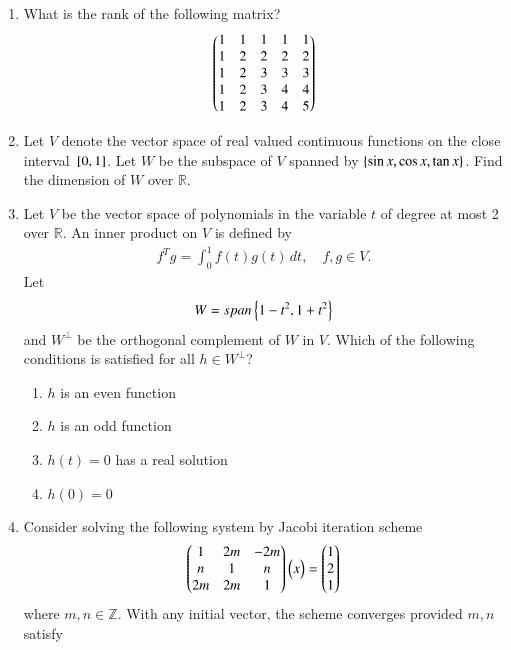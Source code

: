 \begin{enumerate}[label=\thesection.\arabic*.,ref=\thesection.\theenumi]
\begin{enumerate}
\end{enumerate}
\item What is the rank of the following matrix?
\begin{align}
\begin{pmatrix}
1 & 1 & 1 & 1 & 1 \\
1 & 2 & 2 & 2 & 2 \\
1 & 2 & 3 & 3 & 3 \\
1 & 2 & 3 & 4 & 4 \\
1 & 2 & 3 & 4 & 5 
\end{pmatrix}
\end{align}
\item Let $V$ denote the vector space of real valued continuous functions on the close interval ${}\left[0,1\right]$.  Let $W$ be the subspace of $V$ spanned by $\left\{\sin x, \cos x, \tan x\right\}$.  Find the dimension of $W$ over $\mathbb{R}$.
\item Let $V$ be the vector space of polynomials in the variable $t$ of degree at most 2 over $\mathbb{R}$.  An inner product on $V$ is defined by
\begin{align}
f^Tg = \int_{0}^{1}f(t)g(t)\,dt, \quad f,g \in V.
\end{align}
Let
\begin{align}
W = span\left\{1-t^2,1+t^2\right\}
\end{align}
and $W^{\perp}$  be the orthogonal complement of $W$ in $V$.  Which of the following conditions is satisfied for all $h \in W^{\perp}$?
\begin{enumerate}
\item $h$ is an even function
\item $h$ is an odd function
\item $h(t) =0$ has a real solution
\item $h(0) = 0$
\end{enumerate}
\item Consider solving the following system by Jacobi iteration scheme
\begin{align}
\begin{pmatrix}
1 & 2m & -2m \\
n & 1 & n \\
2m & 2m & 1
\end{pmatrix}
\begin{pmatrix}x\end{pmatrix}
= \begin{pmatrix} 1 \\ 2 \\1\end{pmatrix}
\end{align}
where $m,n \in \mathbb{Z}$.  With any initial vector, the scheme converges provided $m,n$ satisfy
\begin{enumerate}
\begin{multicols}{2}

\end{multicols}
\end{enumerate}
\end{enumerate}
